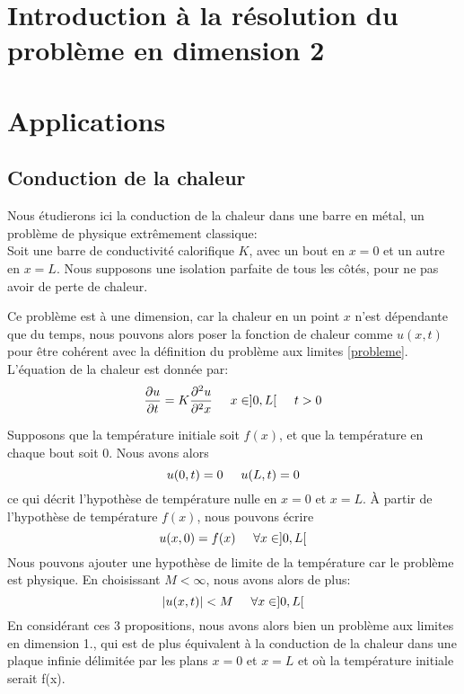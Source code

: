 \documentclass[12pt]{article}
\newcommand{\espace}{\hspace{5mm}}
\begin{document}
\section{Introduction à la résolution du problème en dimension 2}


\section{Applications}

\subsection{Conduction de la chaleur}

Nous étudierons ici la conduction de la chaleur dans une barre en métal, un problème de physique extrêmement classique:\\
Soit une barre de conductivité calorifique $K$, avec un bout en $x = 0$ et un autre en $x = L$. Nous supposons une isolation parfaite de tous les côtés, pour ne pas avoir de perte de chaleur.

\begin{center}
\end{center}

Ce problème est à une dimension, car la chaleur en un point $x$ n'est dépendante que du temps, nous pouvons alors poser la fonction de chaleur comme $u(x,t)$ pour être cohérent avec la définition du problème aux limites \eqref{probleme}.
L'équation de la chaleur est donnée par:
\begin{equation} \label{equationChaleur}
\frac{\partial u}{\partial t} = K \frac{\partial^2 u}{\partial^2 x} \espace x \in]0,L[ \espace t>0
\end{equation}

Supposons que la température initiale soit $f(x)$, et que la température en chaque bout soit 0. Nous avons alors
\begin{equation} \label{temperaturesBouts}
u(0,t) = 0\espace u(L,t) = 0
\end{equation}
ce qui décrit l'hypothèse de température nulle en $x=0$ et $x=L$.  À partir de l'hypothèse de température $f(x)$, nous pouvons écrire
\begin{equation}
u(x,0) = f(x) \espace \forall x \in ]0,L[
\end{equation}
Nous pouvons ajouter une hypothèse de limite de la température car le problème est physique. En choisissant $M < \infty$, nous avons alors de plus:
\begin{equation}
|u(x,t)| < M \espace \forall x \in ]0,L[
\end{equation}
En considérant ces 3 propositions, nous avons alors bien un problème aux limites en dimension 1., qui est de plus équivalent à la conduction de la chaleur dans une plaque infinie délimitée par les plans $x=0$ et $x=L$ et où la température initiale serait f(x).
\end{document}

